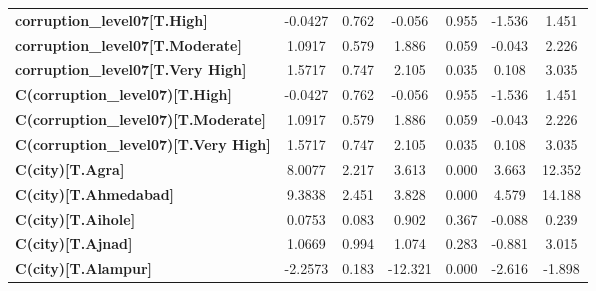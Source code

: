 \begin{center}
\begin{tabular}{lcccccc}
\textbf{corruption\_level07[T.High]}                                                                &      -0.0427  &        0.762     &    -0.056  &         0.955        &       -1.536    &        1.451     \\
\textbf{corruption\_level07[T.Moderate]}                                                            &       1.0917  &        0.579     &     1.886  &         0.059        &       -0.043    &        2.226     \\
\textbf{corruption\_level07[T.Very High]}                                                           &       1.5717  &        0.747     &     2.105  &         0.035        &        0.108    &        3.035     \\
\textbf{C(corruption\_level07)[T.High]}                                                             &      -0.0427  &        0.762     &    -0.056  &         0.955        &       -1.536    &        1.451     \\
\textbf{C(corruption\_level07)[T.Moderate]}                                                         &       1.0917  &        0.579     &     1.886  &         0.059        &       -0.043    &        2.226     \\
\textbf{C(corruption\_level07)[T.Very High]}                                                        &       1.5717  &        0.747     &     2.105  &         0.035        &        0.108    &        3.035     \\
\textbf{C(city)[T.Agra]}                                                                            &       8.0077  &        2.217     &     3.613  &         0.000        &        3.663    &       12.352     \\
\textbf{C(city)[T.Ahmedabad]}                                                                       &       9.3838  &        2.451     &     3.828  &         0.000        &        4.579    &       14.188     \\
\textbf{C(city)[T.Aihole]}                                                                          &       0.0753  &        0.083     &     0.902  &         0.367        &       -0.088    &        0.239     \\
\textbf{C(city)[T.Ajnad]}                                                                           &       1.0669  &        0.994     &     1.074  &         0.283        &       -0.881    &        3.015     \\
\textbf{C(city)[T.Alampur]}                                                                         &      -2.2573  &        0.183     &   -12.321  &         0.000        &       -2.616    &       -1.898     \\

\end{tabular}
\end{center}

